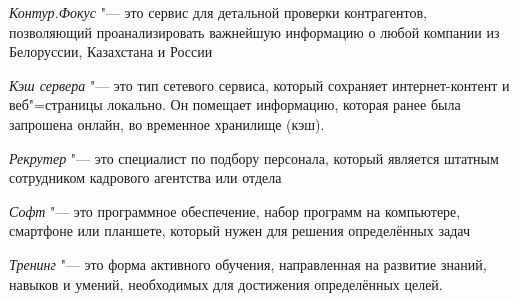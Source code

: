 \documentclass{article}
\begin{document}
\textit{Контур.Фокус} "--- это сервис для детальной проверки контрагентов, позволяющий проанализировать важнейшую информацию о любой компании из Белоруссии, Казахстана и России

\textit{Кэш сервера} "--- это тип сетевого сервиса, который сохраняет интернет-контент и веб"=страницы локально. Он помещает информацию, которая ранее была запрошена онлайн, во временное хранилище (кэш).

\textit{Рекрутер} "--- это специалист по подбору персонала, который является штатным сотрудником кадрового агентства или отдела

\textit{Софт} "--- это программное обеспечение, набор программ на компьютере, смартфоне или планшете, который нужен для решения определённых задач

\textit{Тренинг} "--- это форма активного обучения, направленная на развитие знаний, навыков и умений, необходимых для достижения определённых целей.
\end{document}
